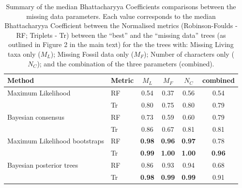 \documentclass[12pt,letterpaper]{article}
\begin{document}
\begin{table}[ht]
\caption{Summary of the median Bhattacharyya Coefficients comparisons between the missing data parameters. Each value corresponds to the median Bhattacharyya Coefficient between the Normalised metrics (Robinson-Foulds - RF; Triplets - Tr) between the ``best'' and the ``missing data'' trees (as outlined in Figure 2 in the main text) for the the trees with: Missing Living taxa only ($M_L$); Missing Fossil data only ($M_F$); Number of characters only ($N_C$); and the combination of the three parameters (combined).} 
\begin{tabular}{llcccc}  
  \hline
 Method & Metric & $M_L$ & $M_F$ & $N_C$ & combined \\ 
  \hline
Maximum Likelihood & RF & 0.54 & 0.37 & 0.56 & 0.54 \\ 
                   & Tr & 0.80 & 0.75 & 0.80 & 0.79 \\ 
Bayesian consensus & RF & 0.73 & 0.59 & 0.60 & 0.79 \\ 
   & Tr & 0.86 & 0.67 & 0.81 & 0.81 \\ 
Maximum Likelihood bootstraps & RF & \textbf{0.98} & \textbf{0.96} & \textbf{0.97} & 0.78 \\ 
   & Tr & \textbf{0.99} & \textbf{1.00} & \textbf{1.00} & \textbf{0.96} \\ 
Bayesian posterior trees & RF & 0.86 & 0.93 & 0.94 & 0.68 \\ 
  & Tr & \textbf{0.98} & \textbf{0.99} & \textbf{0.99} & 0.91 \\ 
 \hline
\end{tabular}
\end{table}
\end{document}
